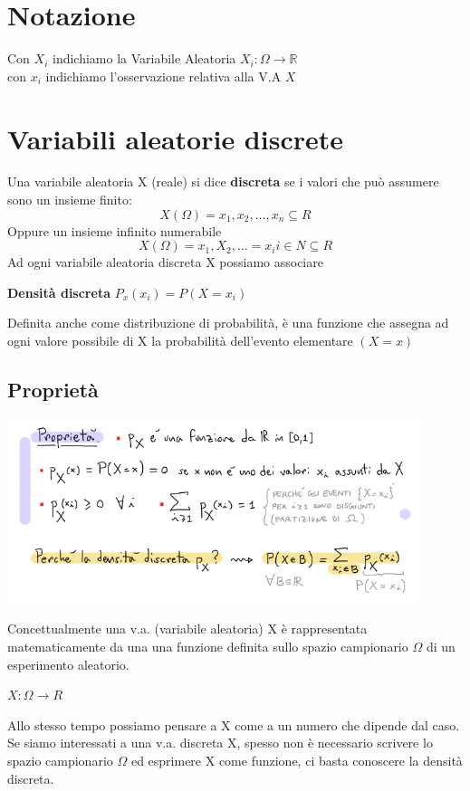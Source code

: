 \documentclass[12pt, a4paper, openany]{book}
\begin{document}
\section{Notazione} Con $X_i$ indichiamo la Variabile Aleatoria $X_i: \Omega \rightarrow \mathbb{R}$
\\ con $x_i$ indichiamo l'osservazione relativa alla V.A $X$

\section{Variabili aleatorie discrete}
Una variabile aleatoria X (reale) si dice \textbf{discreta} se i valori che può
assumere sono un insieme finito:
\begin{equation}
    X(\Omega) = {x_1, x_2, \dots, x_n} \subseteq  R
\end{equation}
Oppure un insieme infinito numerabile
\begin{equation}
    X(\Omega) = {x_1, X_2, \dots } = {x_i} i \in N \subseteq R
\end{equation}
Ad ogni variabile aleatoria discreta X possiamo associare
\begin{center}
    \textbf{Densità discreta} $P_x(x_i) = P(X = x_i)$
\end{center}
Definita anche come distribuzione di probabilità, è una funzione che assegna
ad ogni valore possibile di X la probabilità dell'evento elementare $(X = x)$
\subsection{Proprietà}
\begin{center}
    \includegraphics[width=120mm, scale=0.5]{prop_densità_discreta.png}
\end{center}
Concettualmente una v.a. (variabile aleatoria) X è rappresentata matematicamente da una
una funzione definita sullo spazio campionario $\Omega$ di un esperimento aleatorio.
\begin{center}
    $X:\Omega \to R$
\end{center}
Allo stesso tempo possiamo pensare a X come a un numero che dipende dal caso.
Se siamo interessati a una v.a. discreta X, spesso non è necessario scrivere lo
spazio campionario $\Omega$ ed esprimere X come funzione, 
ci basta conoscere la densità discreta.
\end{document}
